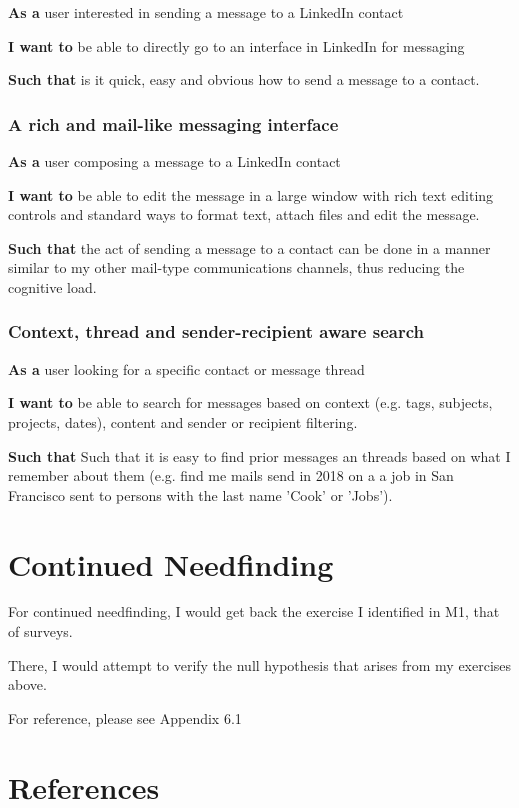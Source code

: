 \documentclass[
	letterpaper, %
]{jdf}
\begin{document}
\textbf{As a} user interested in sending a message to a LinkedIn contact

\textbf{I want to} be able to directly go to an interface in LinkedIn for messaging

\textbf{Such that} is it quick, easy and obvious how to send a message to a contact.

\subsubsection{A rich and mail-like messaging interface}

\textbf{As a} user composing a message to a LinkedIn contact

\textbf{I want to} be able to edit the message in a large window with rich text editing controls and standard ways to format text, attach files and edit the message.

\textbf{Such that} the act of sending a message to a contact can be done in a manner similar to my other mail-type communications channels, thus reducing the cognitive load.

\subsubsection{Context, thread and sender-recipient aware search}

\textbf{As a} user looking for a specific contact or message thread

\textbf{I want to} be able to search for messages based on context (e.g. tags, subjects, projects, dates), content and sender or recipient filtering.

\textbf{Such that} Such that it is easy to find prior messages an threads based on what I remember about them (e.g. find me mails send in 2018 on a a job in San Francisco sent to persons with the last name 'Cook' or 'Jobs').

\section{Continued Needfinding}
For continued needfinding, I would get back the exercise I identified in M1, that of surveys.

There, I would attempt to verify the null hypothesis that arises from my exercises above.

For reference, please see Appendix 6.1

\section{References}
\end{document}
